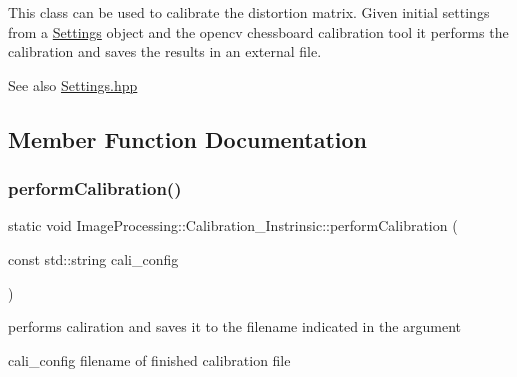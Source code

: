 This class can be used to calibrate the distortion matrix. Given initial settings from a \mbox{\hyperlink{class_image_processing_1_1_settings}{Settings}} object and the opencv chessboard calibration tool it performs the calibration and saves the results in an external file.

\begin{DoxySeeAlso}{See also}
\mbox{\hyperlink{_settings_8hpp_source}{Settings.\+hpp}} 
\end{DoxySeeAlso}


\subsection{Member Function Documentation}
\mbox{\label{class_image_processing_1_1_calibration___instrinsic_acbaa653aac61aa9fc42696a51267b6b8}} 
\subsubsection{\texorpdfstring{perform\+Calibration()}{performCalibration()}}
{\footnotesize\ttfamily static void Image\+Processing\+::\+Calibration\+\_\+\+Instrinsic\+::perform\+Calibration (\begin{DoxyParamCaption}\item[{const std\+::string}]{cali\+\_\+config }\end{DoxyParamCaption})\hspace{0.3cm}{\ttfamily [static]}}

performs caliration and saves it to the filename indicated in the argument \begin{DoxyItemize}
\item cali\+\_\+config filename of finished calibration file \end{DoxyItemize}
\mbox{\label{class_image_processing_1_1_calibration___instrinsic_a69ec772ab65d6fc5918a39b5e5839e2e}} 
